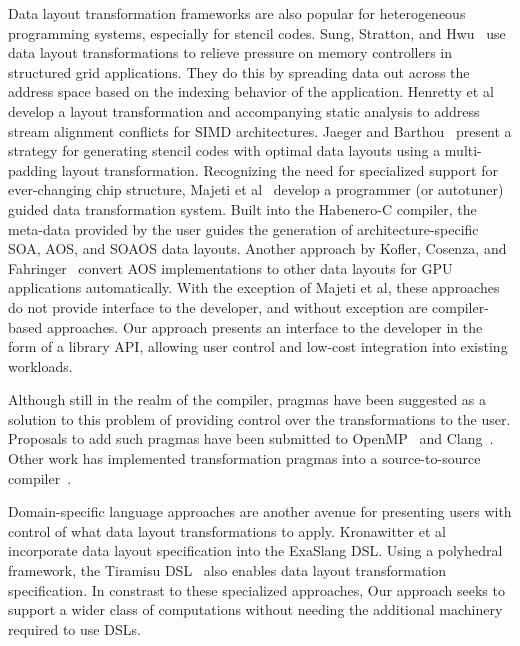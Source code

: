 \documentclass[sigconf,review=true]{acmart}
\begin{document}
Data layout transformation frameworks are also popular for heterogeneous programming systems, especially for stencil codes.
Sung, Stratton, and Hwu~\cite{sung2010data} use data layout transformations to relieve pressure on memory controllers in structured grid applications. 
They do this by spreading data out across the address space based on the indexing behavior of the application.
Henretty et al~\cite{henretty2011data} develop a layout transformation and accompanying static analysis to address stream alignment conflicts for SIMD architectures.
Jaeger and Barthou~\cite{jaeger2012automatic} present a strategy for generating stencil codes with optimal data layouts using a multi-padding layout transformation.
Recognizing the need for specialized support for ever-changing chip structure, Majeti et al~\cite{majeti2013compiler} develop a programmer (or autotuner) guided data transformation system.
Built into the Habenero-C compiler, the meta-data provided by the user guides the generation of architecture-specific SOA, AOS, and SOAOS data layouts.
Another approach by Kofler, Cosenza, and Fahringer~\cite{kofler2015automatic} convert AOS implementations to other data layouts for GPU applications automatically.  
With the exception of Majeti et al, these approaches do not provide interface to the developer, and without exception are compiler-based approaches.
Our approach presents an interface to the developer in the form of a library API, allowing user control and low-cost integration into existing workloads.

Although still in the realm of the compiler, pragmas have been suggested as a solution to this problem of providing control over the transformations to the user.
Proposals to add such pragmas have been submitted to OpenMP~\cite{kruse2019design} and Clang~\cite{kruse2018user}.
Other work has implemented transformation pragmas into a source-to-source compiler~\cite{xu2014semi}. 


Domain-specific language approaches are another avenue for presenting users with control of what data layout transformations to apply. 
Kronawitter et al~\cite{kronawitter2018automatic} incorporate data layout specification into the ExaSlang DSL.
Using a polyhedral framework, the Tiramisu DSL~\cite{baghdadi2019tiramisu} also enables data layout transformation specification.
In constrast to these specialized approaches, Our approach seeks to support a wider class of computations without needing the additional machinery required to use DSLs. 
\end{document}
